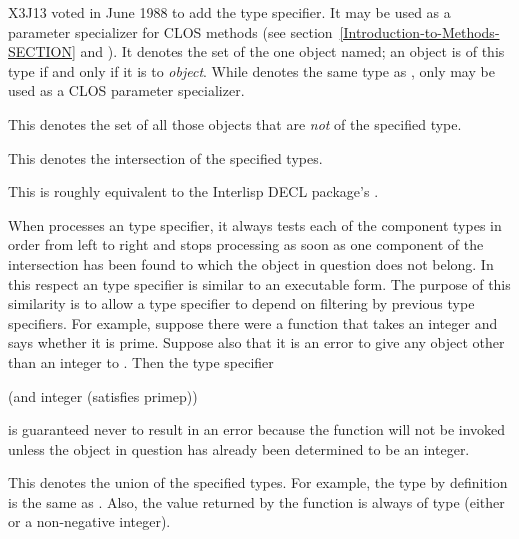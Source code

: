 \begin{newer}
\begin{flushdesc}
\item[\cd{(eql \emph{object})}]
X3J13 voted in June 1988  to add the  type specifier.
It may be used as a parameter specializer for CLOS methods
(see section~\ref{Introduction-to-Methods-SECTION}
and ).
It denotes the set of the one object named;  an object is of
this type if and only if it is  to \emph{object}.  While
 denotes the same type as ,
only  may be used as a CLOS parameter specializer.
\end{flushdesc}
\end{newer}

\begin{flushdesc}
\item[\cd{(not \emph{type})}]
This denotes the set of all those objects that
are \emph{not} of the specified type.

\item[\cd{(and \emph{type1} \emph{type2} ...)}]
This denotes the intersection of
the specified types.

\beforenoterule
\begin{incompatibility}
This is roughly equivalent to
the Interlisp DECL package's .
\end{incompatibility}
\afternoterule

When  processes an  type specifier, it always
tests each of the component types in order from left to right
and stops processing as soon as one component of the intersection has
been found to which the object in question does not belong.
In this respect an  type specifier is similar to an
executable  form.  The purpose of this similarity is to allow
a  type specifier to depend on filtering by previous
type specifiers.  For example, suppose there were a function 
that takes an integer and says whether it is prime.  Suppose also that
it is an error to give any object other than an integer to .
Then the type specifier
\begin{lisp}
(and integer (satisfies primep))
\end{lisp}
is guaranteed never to result in an error because the function 
will not be invoked unless the object in question has already been
determined to be an integer.

\item[\cd{(or \emph{type1} \emph{type2} ...)}]
This denotes the union of the
specified types.  For example, the type  by definition is the same as
.  Also, the value returned by the function
 is always of type 
(either {\nil} or a non-negative integer).


\end{flushdesc}

